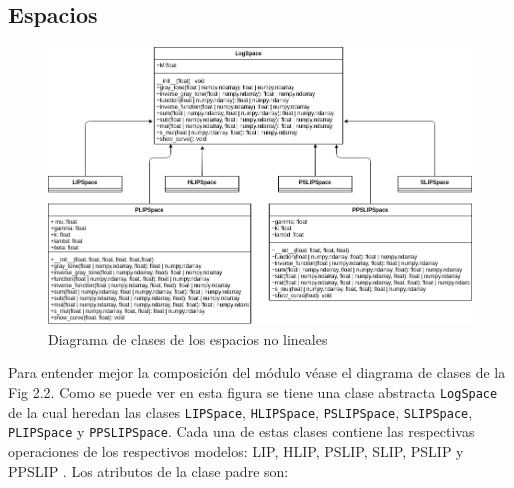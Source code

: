 \subsection{Espacios}

\begin{figure}
	\begin{center}
		\includegraphics[width=16.0 cm]{images/spaces_class_diagram.png}
		\caption{Diagrama de clases de los espacios no lineales}
	\end{center}
\end{figure}

Para entender mejor la composici\'on del m\'odulo v\'ease el diagrama de clases de la Fig 2.2. Como se puede ver en esta figura se tiene una clase abstracta \verb|LogSpace| de la cual heredan las clases \verb|LIPSpace|, \verb|HLIPSpace|, \verb|PSLIPSpace|, \verb|SLIPSpace|, \verb|PLIPSpace| y \verb|PPSLIPSpace|. Cada una de estas clases contiene las respectivas operaciones de los respectivos modelos: LIP, HLIP, PSLIP, SLIP, PSLIP y PPSLIP . Los atributos de la clase padre son:

